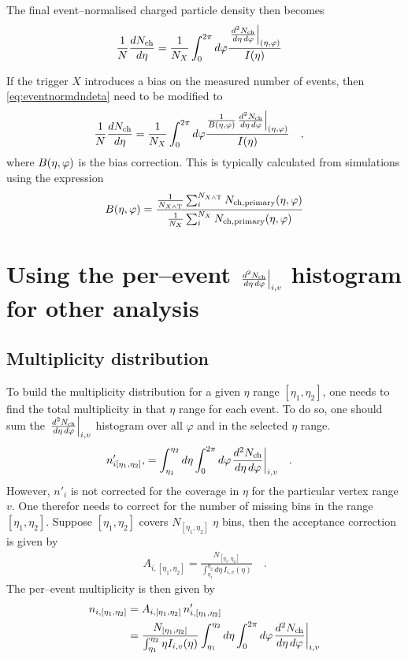 \documentclass[11pt]{article}
\newcommand{\mult}[1][]{\ensuremath N_{\text{ch}#1}}
\newcommand{\dndetadphi}[1][]{{\ensuremath%
    \ifx|#1|\else\left.\fi%
    \frac{d^2\mult{}}{d\eta\,d\varphi}%
    \ifx|#1|\else\right|_{#1}\fi%
}}
\newcommand{\N}[2]{{\ensuremath N_{#1#2}}}
\newcommand{\etaphi}{\ensuremath(\eta,\varphi)}
\begin{document}
The final event--normalised charged particle density then becomes 
\begin{align}
  \frac{1}{N}\frac{dN_{\text{ch}}}{d\eta} &= 
  \frac{1}{\N{X}{}} \int_0^{2\pi} d\varphi
  \frac{\dndetadphi[\etaphi]}{I(\eta)}
  \label{eq:eventnormdndeta}
\end{align}

If the trigger $X$ introduces a bias on the measured number of events,
then \eqref{eq:eventnormdndeta} need to be modified to 
\begin{align}
  \frac{1}{N}\frac{dN_{\text{ch}}}{d\eta} &= 
  \frac{1}{\N{X}{}} \int_0^{2\pi} d\varphi
  \frac{\frac{1}{B\etaphi}\dndetadphi[\etaphi]}{I(\eta)}
  \label{eq:eventnormdndeta2}\quad,
\end{align}
where $B\etaphi$ is the bias correction.  This is typically
calculated from simulations using the expression 
\begin{align}
  B\etaphi = \frac{\frac{1}{\N{X\wedge
        \text{T}}{}}\sum_i^{\N{X\wedge \text{T}}{}}
    \mult[,\text{primary}]\etaphi}{\frac{1}{\N{X}{}}\sum_i^{\N{X}{}}
    \mult[,\text{primary}]\etaphi}
\end{align}


\section{Using the per--event $\dndetadphi[i,v]$ histogram for other
  analysis} 

\subsection{Multiplicity distribution} 

To build the multiplicity distribution for a given $\eta$ range
$[\eta_1,\eta_2]$, one needs to find the total multiplicity in that
$\eta$ range for each event. To do so, one should sum the
$\dndetadphi[i,v]$ histogram over all $\varphi$ and in the selected
$\eta$ range.
\begin{align}
  n'_{i[\eta_1,\eta_2]}, &= \int_{\eta_1}^{\eta_2}d\eta\int_0^{2\pi}d\varphi
  \dndetadphi[i,v]\quad.\nonumber
\end{align}
However, $n'_i$ is not corrected for the coverage in $\eta$ for the
particular vertex range $v$.  One therefor needs to correct for the
number of missing bins in the range $[\eta_1,\eta_2]$.  Suppose
$[\eta_1,\eta_2]$ covers $N_{[\eta_1,\eta_2]}$ $\eta$ bins, then the acceptance
correction is given by 
\begin{align}
  A_{i,[\eta_1,\eta_2]} = \frac{N_{[\eta_1,\eta_2]}}{\int_{\eta_1}^{\eta_2}d\eta\,
    I_{i,v}(\eta)}\quad.\nonumber
\end{align}
The per--event multiplicity is then given by 
\begin{align}
  n_{i,[\eta_1,\eta_2]} &= A_{i,[\eta_1,\eta_2]}\,n'_{i,[\eta_1,\eta_2]}\nonumber\\
  &= \frac{N_{[\eta_1,\eta_2]}}{\int_{\eta_1}^{\eta_2}\eta
    I_{i,v}(\eta)} \int_{\eta_1}^{\eta_2}d\eta\int_0^{2\pi}d\varphi
  \dndetadphi[i,v]
  \label{eq:event_n}
\end{align}
\end{document}
